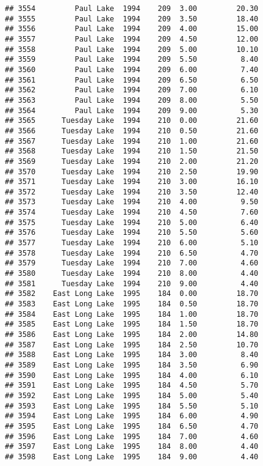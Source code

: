 \documentclass[
]{article}
\begin{document}
\begin{verbatim}
## 3554         Paul Lake  1994    209  3.00         20.30
## 3555         Paul Lake  1994    209  3.50         18.40
## 3556         Paul Lake  1994    209  4.00         15.00
## 3557         Paul Lake  1994    209  4.50         12.00
## 3558         Paul Lake  1994    209  5.00         10.10
## 3559         Paul Lake  1994    209  5.50          8.40
## 3560         Paul Lake  1994    209  6.00          7.40
## 3561         Paul Lake  1994    209  6.50          6.50
## 3562         Paul Lake  1994    209  7.00          6.10
## 3563         Paul Lake  1994    209  8.00          5.50
## 3564         Paul Lake  1994    209  9.00          5.30
## 3565      Tuesday Lake  1994    210  0.00         21.60
## 3566      Tuesday Lake  1994    210  0.50         21.60
## 3567      Tuesday Lake  1994    210  1.00         21.60
## 3568      Tuesday Lake  1994    210  1.50         21.50
## 3569      Tuesday Lake  1994    210  2.00         21.20
## 3570      Tuesday Lake  1994    210  2.50         19.90
## 3571      Tuesday Lake  1994    210  3.00         16.10
## 3572      Tuesday Lake  1994    210  3.50         12.40
## 3573      Tuesday Lake  1994    210  4.00          9.50
## 3574      Tuesday Lake  1994    210  4.50          7.60
## 3575      Tuesday Lake  1994    210  5.00          6.40
## 3576      Tuesday Lake  1994    210  5.50          5.60
## 3577      Tuesday Lake  1994    210  6.00          5.10
## 3578      Tuesday Lake  1994    210  6.50          4.70
## 3579      Tuesday Lake  1994    210  7.00          4.60
## 3580      Tuesday Lake  1994    210  8.00          4.40
## 3581      Tuesday Lake  1994    210  9.00          4.40
## 3582    East Long Lake  1995    184  0.00         18.70
## 3583    East Long Lake  1995    184  0.50         18.70
## 3584    East Long Lake  1995    184  1.00         18.70
## 3585    East Long Lake  1995    184  1.50         18.70
## 3586    East Long Lake  1995    184  2.00         14.80
## 3587    East Long Lake  1995    184  2.50         10.70
## 3588    East Long Lake  1995    184  3.00          8.40
## 3589    East Long Lake  1995    184  3.50          6.90
## 3590    East Long Lake  1995    184  4.00          6.10
## 3591    East Long Lake  1995    184  4.50          5.70
## 3592    East Long Lake  1995    184  5.00          5.40
## 3593    East Long Lake  1995    184  5.50          5.10
## 3594    East Long Lake  1995    184  6.00          4.90
## 3595    East Long Lake  1995    184  6.50          4.70
## 3596    East Long Lake  1995    184  7.00          4.60
## 3597    East Long Lake  1995    184  8.00          4.40
## 3598    East Long Lake  1995    184  9.00          4.40

\end{verbatim}
\end{document}
